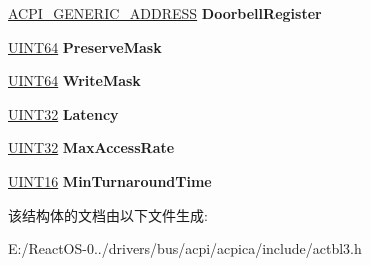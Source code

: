\begin{DoxyCompactItemize}
\hyperlink{structacpi__generic__address}{A\+C\+P\+I\+\_\+\+G\+E\+N\+E\+R\+I\+C\+\_\+\+A\+D\+D\+R\+E\+SS} {\bfseries Doorbell\+Register}
\item 
\mbox{\label{structacpi__pcct__hw__reduced_a9dfa0a02400ac27a384be1a777ac06c2}} 
\hyperlink{_processor_bind_8h_a57be03562867144161c1bfee95ca8f7c}{U\+I\+N\+T64} {\bfseries Preserve\+Mask}
\item 
\mbox{\label{structacpi__pcct__hw__reduced_ad2df1fa70c48cee4ca10c36942e6253d}} 
\hyperlink{_processor_bind_8h_a57be03562867144161c1bfee95ca8f7c}{U\+I\+N\+T64} {\bfseries Write\+Mask}
\item 
\mbox{\label{structacpi__pcct__hw__reduced_a9e2c1bed2f874eaca828a7b7dd32afff}} 
\hyperlink{_processor_bind_8h_ae1e6edbbc26d6fbc71a90190d0266018}{U\+I\+N\+T32} {\bfseries Latency}
\item 
\mbox{\label{structacpi__pcct__hw__reduced_a4f21e655ee347d252be00a76c85fcd47}} 
\hyperlink{_processor_bind_8h_ae1e6edbbc26d6fbc71a90190d0266018}{U\+I\+N\+T32} {\bfseries Max\+Access\+Rate}
\item 
\mbox{\label{structacpi__pcct__hw__reduced_a2e8aacbbbc9660dcd4dc2632d71f7576}} 
\hyperlink{_processor_bind_8h_a09f1a1fb2293e33483cc8d44aefb1eb1}{U\+I\+N\+T16} {\bfseries Min\+Turnaround\+Time}
\end{DoxyCompactItemize}


该结构体的文档由以下文件生成\+:\begin{DoxyCompactItemize}
\item 
E\+:/\+React\+O\+S-\/0../drivers/bus/acpi/acpica/include/actbl3.\+h\end{DoxyCompactItemize}
